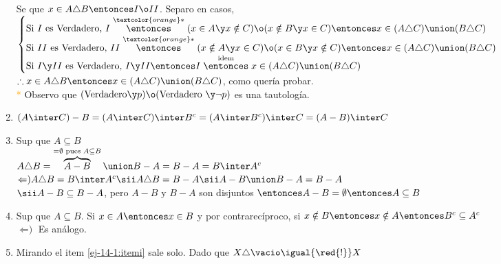 \begin{enumerate}[label=\roman*)]
    Se que $x \in A \triangle B \entonces I \o II$. Separo en casos, \\
    $\begin{cases}
      \text{Si }I\text{ es Verdadero, }I \stackrel{\textcolor{orange}*}{\entonces} (x \in A \y x \notin C) \o (x \notin B \y x \in C) \entonces x \in (A \triangle C) \union (B \triangle C) \\
      \text{Si }II\text{ es Verdadero, }II \stackrel{\textcolor{orange}*}{\entonces} (x \notin A \y x \in C) \o (x \in B \y x \notin C) \entonces x \in (A \triangle C) \union (B \triangle C) \\
      \text{Si }I \y II\text{ es Verdadero, }I \y II \entonces I \stackrel{\text{idem}}{\entonces} x \in (A \triangle C) \union (B \triangle C)
    \end{cases}$ \\
    $\therefore x \in A \triangle B \entonces x \in (A \triangle C) \union (B \triangle C)$, como quería probar. \\
    {\textcolor{orange}*} Observo que $(\text{Verdadero} \y p) \o (\text{Verdadero } \y \neg p)$ es una tautología.

  \item $(A \inter C) - B = (A \inter C) \inter B^c = (A \inter B^c) \inter C = (A-B) \inter C$
  \item  \text{$\Rightarrow$)} Sup que $A \subseteq B$ \\
  $A \triangle B = \overbrace{A - B}^{= \emptyset \text{ pues }A \subseteq B} \union B - A = B - A = B \inter A^c$ \\
  $\text{$\Leftarrow$)}A \triangle B = B \inter A^c \sii A \triangle B = B - A \sii A - B \union B - A = B - A$ \\
  $\sii A - B \subseteq B - A$, pero $A - B$ y $B - A$ son disjuntos $\entonces A - B = \emptyset \entonces A \subseteq B$
  \item \text{$\Rightarrow$)} Sup que $A \subseteq B$. Si $x \in A \entonces x \in B$ y por contrarecíproco, si $x \notin B \entonces x \notin A \entonces B^c \subseteq A^c$ \\
  $\text{$\Leftarrow$)}$ Es análogo.
  \item Mirando el item \ref{ej-14-1:itemi} sale solo. Dado que $X \triangle \vacio \igual{\red{!}} X$
\end{enumerate}

\begin{aportes}
  \item {}
  \item {}
\end{aportes}
